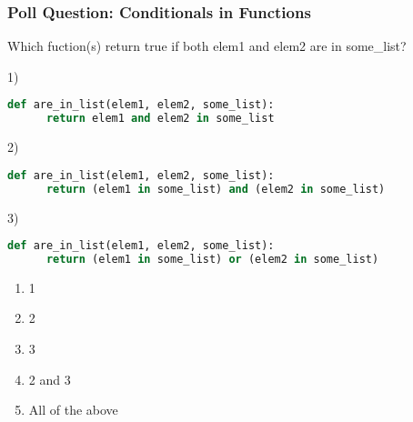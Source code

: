 \documentclass{beamer}
\begin{document}
%
%
\begin{frame}[fragile]
	\frametitle{Poll Question: Conditionals in Functions}
  Which fuction(s) return true if both elem1 and elem2 are in some\_list?
	\begin{minipage}{0.69\textwidth}
    1)
		\begin{lstlisting}[language=Python, autogobble,basicstyle=\tiny,numbers=none]
    def are_in_list(elem1, elem2, some_list):
      return elem1 and elem2 in some_list
		\end{lstlisting}
    \vspace{1cm}
    2)
		\begin{lstlisting}[language=Python, autogobble,basicstyle=\tiny,numbers=none]
    def are_in_list(elem1, elem2, some_list):
      return (elem1 in some_list) and (elem2 in some_list)
		\end{lstlisting}
    \vspace{1cm}
    3)
		\begin{lstlisting}[language=Python, autogobble,basicstyle=\tiny,numbers=none]
    def are_in_list(elem1, elem2, some_list):
      return (elem1 in some_list) or (elem2 in some_list)
		\end{lstlisting}
	\end{minipage}
	\begin{minipage}{0.29\textwidth}
    \begin{enumerate}[A]
      \item 1
      \item 2
      \item 3
      \item 2 and 3
      \item All of the above
    \end{enumerate}
	\end{minipage}
\end{frame}
\end{document}
